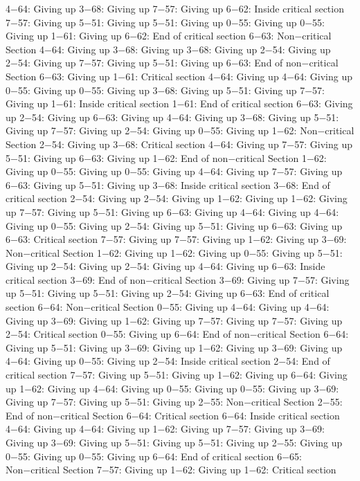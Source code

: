 4−64: Giving up
3−68: Giving up
7−57: Giving up
6−62: Inside critical section
7−57: Giving up
5−51: Giving up
5−51: Giving up
0−55: Giving up
0−55: Giving up
1−61: Giving up
6−62: End of critical section
6−63: Non−critical Section
4−64: Giving up
3−68: Giving up
3−68: Giving up
2−54: Giving up
2−54: Giving up
7−57: Giving up
5−51: Giving up
6−63: End of non−critical Section
6−63: Giving up
1−61: Critical section
4−64: Giving up
4−64: Giving up
0−55: Giving up
0−55: Giving up
3−68: Giving up
5−51: Giving up
7−57: Giving up
1−61: Inside critical section
1−61: End of critical section
6−63: Giving up
2−54: Giving up
6−63: Giving up
4−64: Giving up
3−68: Giving up
5−51: Giving up
7−57: Giving up
2−54: Giving up
0−55: Giving up
1−62: Non−critical Section
2−54: Giving up
3−68: Critical section
4−64: Giving up
7−57: Giving up
5−51: Giving up
6−63: Giving up
1−62: End of non−critical Section
1−62: Giving up
0−55: Giving up
0−55: Giving up
4−64: Giving up
7−57: Giving up
6−63: Giving up
5−51: Giving up
3−68: Inside critical section
3−68: End of critical section
2−54: Giving up
2−54: Giving up
1−62: Giving up
1−62: Giving up
7−57: Giving up
5−51: Giving up
6−63: Giving up
4−64: Giving up
4−64: Giving up
0−55: Giving up
2−54: Giving up
5−51: Giving up
6−63: Giving up
6−63: Critical section
7−57: Giving up
7−57: Giving up
1−62: Giving up
3−69: Non−critical Section
1−62: Giving up
1−62: Giving up
0−55: Giving up
5−51: Giving up
2−54: Giving up
2−54: Giving up
4−64: Giving up
6−63: Inside critical section
3−69: End of non−critical Section
3−69: Giving up
7−57: Giving up
5−51: Giving up
5−51: Giving up
2−54: Giving up
6−63: End of critical section
6−64: Non−critical Section
0−55: Giving up
4−64: Giving up
4−64: Giving up
3−69: Giving up
1−62: Giving up
7−57: Giving up
7−57: Giving up
2−54: Critical section
0−55: Giving up
6−64: End of non−critical Section
6−64: Giving up
5−51: Giving up
3−69: Giving up
1−62: Giving up
3−69: Giving up
4−64: Giving up
0−55: Giving up
2−54: Inside critical section
2−54: End of critical section
7−57: Giving up
5−51: Giving up
1−62: Giving up
6−64: Giving up
1−62: Giving up
4−64: Giving up
0−55: Giving up
0−55: Giving up
3−69: Giving up
7−57: Giving up
5−51: Giving up
2−55: Non−critical Section
2−55: End of non−critical Section
6−64: Critical section
6−64: Inside critical section
4−64: Giving up
4−64: Giving up
1−62: Giving up
7−57: Giving up
3−69: Giving up
3−69: Giving up
5−51: Giving up
5−51: Giving up
2−55: Giving up
0−55: Giving up
0−55: Giving up
6−64: End of critical section
6−65: Non−critical Section
7−57: Giving up
1−62: Giving up
1−62: Critical section
